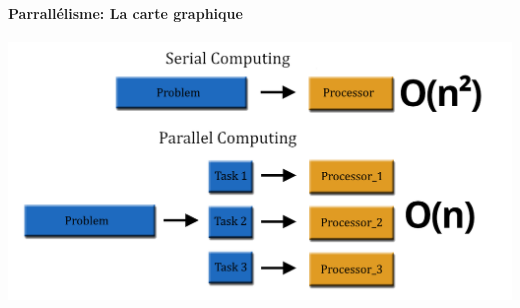 \section{\trdpti}


\begin{frame}
\frametitle{\trdpti}
\framesubtitle{}

    \centering {\huge \trdpti}

\end{frame}


\begin{frame}
    \frametitle{\trdpti}
    \framesubtitle{Parrallélisme: La carte graphique}
    
    \centering
    \includegraphics[width=1.0\linewidth]{figures/parallel_computing_vs_sequential_computing.png}
    
\end{frame}




